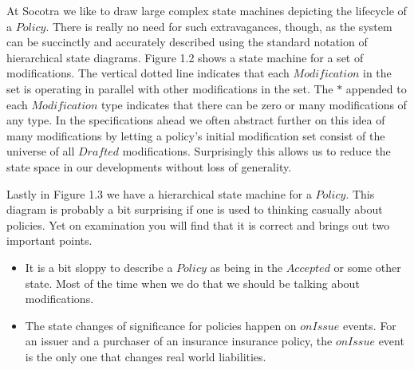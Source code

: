 
At Socotra we like to draw large complex state machines depicting the lifecycle of a $Policy$. There is really no need
for such extravagances, though, as the system can be succinctly and accurately described using the
standard notation of hierarchical state diagrams. Figure 1.2 shows a state machine for a set of modifications. The vertical
dotted line indicates that each $Modification$ in the set is operating in parallel with other modifications in the set. The
$*$ appended to each $Modification$ type indicates that there can be zero or many modifications of any type. In the
specifications ahead we often abstract further on this idea of many modifications by letting a policy's initial
modification set consist of the universe of all $Drafted$ modifications. Surprisingly this allows us to reduce the
state space in our developments without loss of generality.

Lastly in Figure 1.3 we have a hierarchical state machine for a $Policy$. This diagram is probably
a bit surprising if one is used to thinking casually about policies. Yet on examination you will
find that it is correct and brings out two important points.
\begin{itemize}
\item It is a bit sloppy to describe a $Policy$ as being in the $Accepted$ or some other state.
  Most of the time when we do that we should be talking about modifications. 
\item The state changes of significance for policies happen on $onIssue$ events. For an issuer and a purchaser
  of an insurance insurance policy, the $onIssue$ event is the only one that changes real world liabilities.
\end{itemize}

